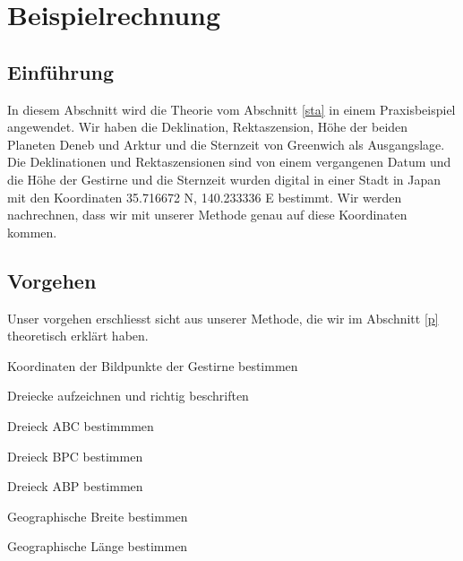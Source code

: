 \section{Beispielrechnung}

\subsection{Einführung}
In diesem Abschnitt wird die Theorie vom Abschnitt \ref{sta} in einem Praxisbeispiel angewendet. 
Wir haben die Deklination, Rektaszension, Höhe der beiden Planeten Deneb und Arktur und die Sternzeit von Greenwich als Ausgangslage.
Die Deklinationen und Rektaszensionen sind von einem vergangenen Datum und die Höhe der Gestirne und die Sternzeit wurden digital in einer Stadt in Japan mit den Koordinaten 35.716672 N, 140.233336 E bestimmt.
Wir werden nachrechnen, dass wir mit unserer Methode genau auf diese Koordinaten kommen.
\subsection{Vorgehen}
Unser vorgehen erschliesst sicht aus unserer Methode, die wir im Abschnitt \ref{p} theoretisch erklärt haben.
\begin{compactenum}
\item
Koordinaten der Bildpunkte der Gestirne bestimmen 
\item
Dreiecke aufzeichnen und richtig beschriften
\item
Dreieck ABC bestimmmen
\item
Dreieck BPC bestimmen 
\item
Dreieck ABP bestimmen 
\item
Geographische Breite bestimmen
\item
Geographische Länge bestimmen
\end{compactenum}


